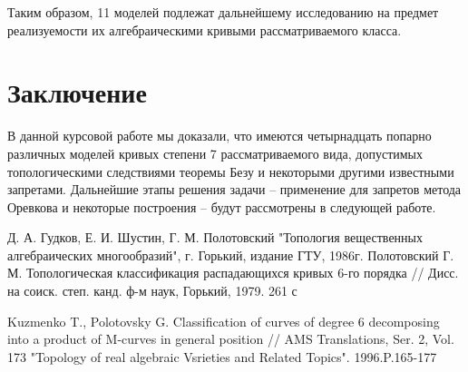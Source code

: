 \documentclass[11pt]{article}
\begin{document}
Таким образом, 11 моделей подлежат дальнейшему исследованию на предмет реализуемости их алгебраическими кривыми рассматриваемого класса.

\newpage
\section{Заключение}
В данной курсовой работе мы доказали, что имеются четырнадцать попарно различных моделей кривых степени 7 рассматриваемого вида, допустимых топологическими следствиями теоремы Безу и некоторыми другими известными запретами. Дальнейшие этапы решения задачи -- применение для запретов метода Оревкова и некоторые построения -- будут рассмотрены в следующей работе.

\newpage
{}
\begin{thebibliography}{}
 Д. А. Гудков, Е. И. Шустин, Г. М. Полотовский "Топология вещественных алгебраических многообразий", г. Горький, издание ГТУ, 1986г.
Полотовский Г. М. Топологическая классификация распадающихся кривых 6-го порядка // Дисс. на соиск. степ. канд. ф-м наук, Горький, 1979. 261 с

Kuzmenko T., Polotovsky G. Classification of curves of degree 6 decomposing into a product of M-curves in general position // AMS Translations, Ser. 2, Vol. 173 "Topology of real algebraic Vsrieties and Related Topics". 1996.P.165-177

\end{thebibliography}


\makeatother
\end{document}
